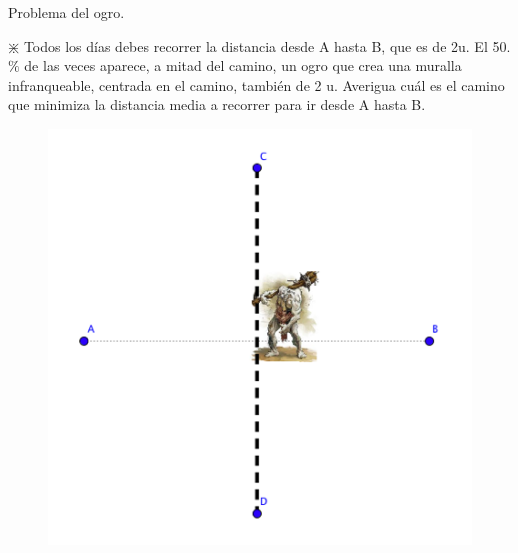	
	\begin{ejre}  Problema del ogro.
	\begin{multicols}{2}

	$\divideontimes$ Todos los días debes recorrer la distancia desde A hasta B, que es de 2u. El 50. $\%$ de las veces aparece, a mitad del camino, un ogro que crea una muralla infranqueable, centrada en el camino, también de 2 u. Averigua cuál es el camino que minimiza la distancia media a recorrer para ir desde A hasta B.

	\begin{figure}[H]
	\centering
	\includegraphics[width=.4\textwidth]{imagenes/imagenes05/T05IM20.png}
	\end{figure}
	\end{multicols}
	
	
	\end{ejre}
	
